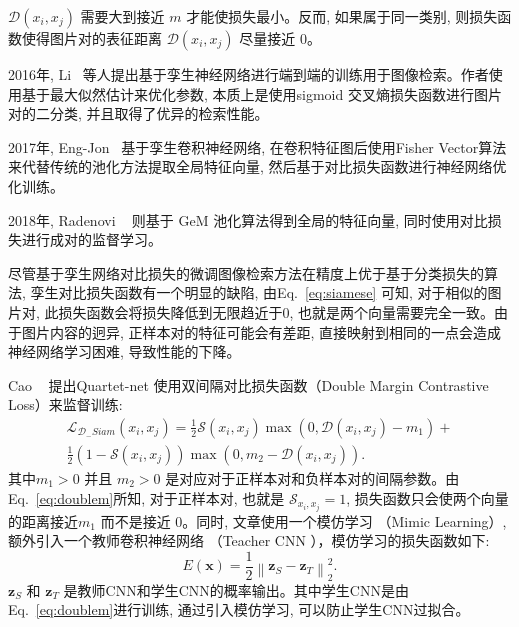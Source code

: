 $\mathcal{D}(x_i,x_j)$ 需要大到接近 $m$ 才能使损失最小。反而, 如果属于同一类别, 则损失函数使得图片对的表征距离 $\mathcal{D}(x_i, x_j)$ 尽量接近 0。\par
2016年, Li~\cite{li2015feature} 等人提出基于孪生神经网络进行端到端的训练用于图像检索。作者使用基于最大似然估计来优化参数, 本质上是使用sigmoid 交叉熵损失函数进行图片对的二分类, 并且取得了优异的检索性能。 \par
2017年, Eng-Jon~\cite{ong2017siamese} 基于孪生卷积神经网络, 在卷积特征图后使用Fisher Vector算法来代替传统的池化方法提取全局特征向量, 然后基于对比损失函数进行神经网络优化训练。\par
2018年, Radenovi ~\cite{radenovic2018fine} 则基于 GeM 池化算法得到全局的特征向量, 同时使用对比损失进行成对的监督学习。 \par
尽管基于孪生网络对比损失的微调图像检索方法在精度上优于基于分类损失的算法, 孪生对比损失函数有一个明显的缺陷, 由Eq.~\ref{eq:siamese} 可知, 对于相似的图片对, 此损失函数会将损失降低到无限趋近于0, 也就是两个向量需要完全一致。由于图片内容的迥异, 正样本对的特征可能会有差距, 直接映射到相同的一点会造成神经网络学习困难, 导致性能的下降。 \par
Cao ~\cite{cao2016quartet} 提出Quartet-net 使用双间隔对比损失函数（Double Margin Contrastive Loss）来监督训练:
\begin{equation}
    \begin{array}{r}
        \mathcal{L}_{\mathcal{D}_{-} S i a m}\left(x_i, x_j\right)=\frac{1}{2} \mathcal{S}\left(x_i, x_j\right) \max \left(0, \mathcal{D}\left(x_i, x_j\right)-m_1\right)+ \\
        \frac{1}{2}\left(1-\mathcal{S}\left(x_i, x_j\right)\right) \max \left(0, m_2-\mathcal{D}\left(x_i, x_j\right)\right).
        \end{array}
        \label{eq:doublem}
\end{equation}
其中$m_1 > 0$ 并且 $m_2 > 0$ 是对应对于正样本对和负样本对的间隔参数。由 Eq.~\ref{eq:doublem}所知, 对于正样本对, 也就是 $\mathcal{S}_{x_i, x_j} = 1$, 损失函数只会使两个向量的距离接近$m_1$ 而不是接近 $0$。同时, 文章使用一个模仿学习 （Mimic Learning）, 额外引入一个教师卷积神经网络 （Teacher CNN ），模仿学习的损失函数如下:
\begin{equation}
    E(\mathbf{x})=\frac{1}{2}\left\|\mathbf{z}_S-\mathbf{z}_T\right\|_2^2.
\end{equation}
$\mathbf{z}_S$ 和 $\mathbf{z}_{T}$ 是教师CNN和学生CNN的概率输出。其中学生CNN是由Eq.~\ref{eq:doublem}进行训练, 通过引入模仿学习, 可以防止学生CNN过拟合。 \par
